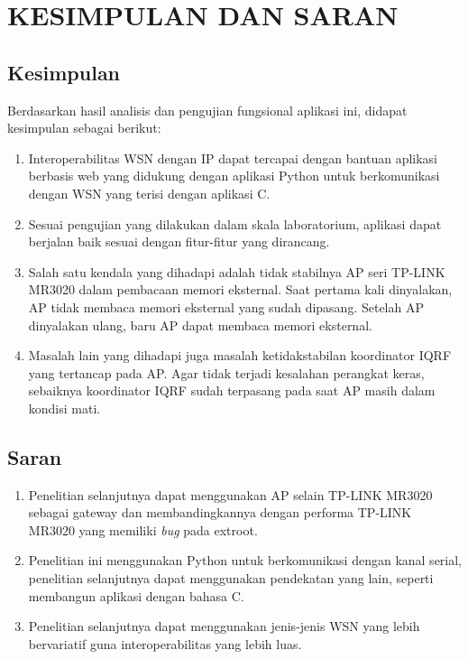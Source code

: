 
\chapter{KESIMPULAN DAN SARAN}

\section{Kesimpulan}
	Berdasarkan hasil analisis dan pengujian fungsional aplikasi ini, didapat kesimpulan sebagai berikut:

	\begin{enumerate}
		\item Interoperabilitas WSN dengan IP dapat tercapai dengan bantuan aplikasi berbasis web yang didukung dengan aplikasi Python untuk berkomunikasi dengan WSN yang terisi dengan aplikasi C.

		\item Sesuai pengujian yang dilakukan dalam skala laboratorium, aplikasi dapat berjalan baik sesuai dengan fitur-fitur yang dirancang.

		\item Salah satu kendala yang dihadapi adalah tidak stabilnya AP seri TP-LINK MR3020 dalam pembacaan memori eksternal. Saat pertama kali dinyalakan, AP tidak membaca memori eksternal yang sudah dipasang. Setelah AP dinyalakan ulang, baru AP dapat membaca memori eksternal.

		\item Masalah lain yang dihadapi juga masalah ketidakstabilan koordinator IQRF yang tertancap pada AP. Agar tidak terjadi kesalahan perangkat keras, sebaiknya koordinator IQRF sudah terpasang pada saat AP masih dalam kondisi mati.
	\end{enumerate}


\section{Saran}
	\begin{enumerate}
		\item Penelitian selanjutnya dapat menggunakan AP selain TP-LINK MR3020 sebagai gateway dan membandingkannya dengan performa TP-LINK MR3020 yang memiliki \emph{bug} pada extroot.
		\item Penelitian ini menggunakan Python untuk berkomunikasi dengan kanal serial, penelitian selanjutnya dapat menggunakan pendekatan yang lain, seperti membangun aplikasi dengan bahasa C.
		\item Penelitian selanjutnya dapat menggunakan jenis-jenis WSN yang lebih bervariatif guna interoperabilitas yang lebih luas.
	\end{enumerate}

	
\begin{comment}

\end{comment}
